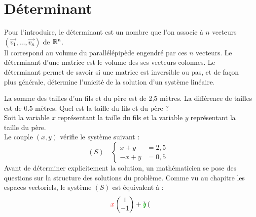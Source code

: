 \documentclass{book}
\begin{document}
\chapter*{Déterminant}
\begin{Texte}%
Pour l'introduire, le déterminant est un nombre que l'on associe à $n$ vecteurs $(\vec{v_1},\ldots,\vec{v_n})$ de $\R^n$.\\
Il correspond au volume du parallélépipède engendré par ces $n$ vecteurs. Le déterminant d'une matrice  est le volume des ses vecteurs colonnes. Le déterminant permet de savoir
si une matrice est inversible ou pas, et de façon plus générale,
détermine l'unicité de la solution d'un système linéaire.
\end{Texte}
\begin{Exemple} %
La somme des tailles d'un fils et du père est de 2,5 mètres. La différence de tailles  est de 0.5 mètres.
Quel est la taille du fils et du père ? \\
Soit la variable $x$ représentant la taille du fils et la variable $y$ représentant la taille du père.\\
Le couple $(x,y)$ vérifie le système suivant  :
$$(S)\quad \begin{cases}
x+y&=2,5\\
-x+y&=0,5
\end{cases}
$$
Avant de déterminer explicitement la solution, un mathématicien se pose des questions sur la structure des solutions du problème. Comme vu au chapitre les espaces vectoriels, le système $(S)$ est équivalent à :
$$	
	 {\color{red}x}\begin{pmatrix}
 1    \\
 -1   \\
\end{pmatrix}+{\color{green}y}\begin{pmatrix}

\end{pmatrix}$$
\end{Exemple}
\end{document}

